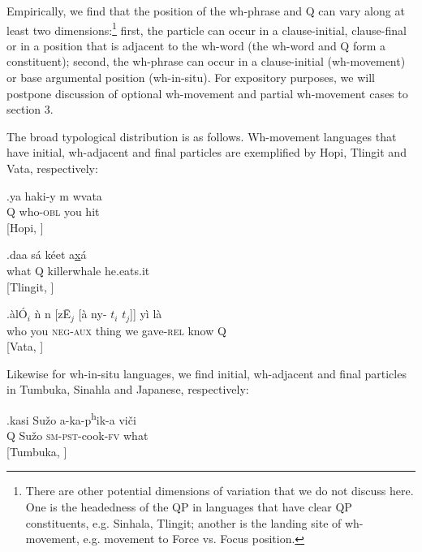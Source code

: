 \documentclass[11pt]{article}
\begin{document}
Empirically, we find that the position of the wh-phrase and Q can vary along at least two dimensions:\footnote{There are other potential dimensions of variation that we do not discuss here. One is the headedness of the QP in languages that have clear QP constituents, e.g. Sinhala, Tlingit; another is the landing site of wh-movement, e.g. movement to Force vs. Focus position.} first, the particle can occur in a clause-initial, clause-final or in a position that is adjacent to the wh-word (the wh-word and Q form a constituent); second, the wh-phrase can occur in a clause-initial (wh-movement) or base argumental position (wh-in-situ). For expository purposes, we will postpone discussion of optional wh-movement and partial wh-movement cases to section 3.

The broad typological distribution is as follows. Wh-movement languages that have initial, wh-adjacent and final particles are exemplified by Hopi, Tlingit and Vata, respectively:


\exg.\label{wh.50}ya haki-y {\textraiseglotstop\textbari}m w{\textbari}va{\textraiseglotstop}ta \\
  Q who-\textsc{obl} you hit \\
  \hspace{\fill}[Hopi, \cite{jeanne:1978}]

\exg.\label{wh.60}daa s\'a k\'eet a\underline{x}\'a \\
  what Q killerwhale he.eats.it \\
  \hspace{\fill}[Tlingit, \cite{cable:2007}]

\exg.\label{wh.70}\`al\'O$_i$ \`n n{} [z\={E}$_j$ [\`a ny{}-{} $t_i$ $t_j$]] y\`i l\`a\\
  who you \textsc{neg-aux} thing we gave-\textsc{rel} {} {} know Q \\
  \hspace{\fill}[Vata, \cite{koopman:1984}]

Likewise for wh-in-situ languages, we find initial, wh-adjacent and final particles in Tumbuka, Sinahla and Japanese, respectively:

\exg.\label{wh.80}kasi Su\v{z}o a-ka-p\textsuperscript{h}ik-a vi\v{c}i \\
  Q Su\v{z}o \textsc{sm-pst}-cook-\textsc{fv} what \\
  \hspace{\fill}[Tumbuka, \cite{kimper:2006}]
\end{document}

